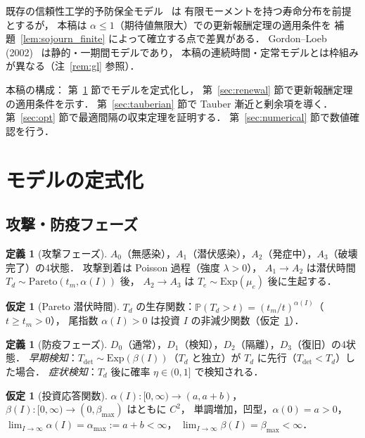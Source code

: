 \documentclass[12pt,a4paper]{article}
\theoremstyle{plain}
\theoremstyle{definition}
\newtheorem{definition}[theorem]{定義}
\newtheorem{assumption}[theorem]{仮定}
\theoremstyle{remark}
\newcommand{\Prob}{\mathbb{P}}
\newcommand{\Tdet}{T_{\mathrm{det}}}
\newcommand{\betaI}{\beta(I)}
\newcommand{\alphI}{\alpha(I)}
\begin{document}
既存の信頼性工学的予防保全モデル~\cite{barlow1965,nakagawa2005} は
有限モーメントを持つ寿命分布を前提とするが，
本稿は $\alpha\le1$（期待値無限大）での更新報酬定理の適用条件を
補題~\ref{lem:sojourn_finite} によって確立する点で差異がある．
Gordon--Loeb (2002)~\cite{gordon2002} は静的・一期間モデルであり，
本稿の連続時間・定常モデルとは枠組みが異なる（注~\ref{rem:gl} 参照）．

本稿の構成：
第~\ref{sec:model} 節でモデルを定式化し，
第~\ref{sec:renewal} 節で更新報酬定理の適用条件を示す．
第~\ref{sec:tauberian} 節で Tauber 漸近と剰余項を導く．
第~\ref{sec:opt} 節で最適間隔の収束定理を証明する．
第~\ref{sec:numerical} 節で数値確認を行う．

\section{モデルの定式化}
\label{sec:model}

\subsection{攻撃・防疫フェーズ}

\begin{definition}[攻撃フェーズ]\label{def:attack}
$A_0$（無感染），$A_1$（潜伏感染），$A_2$（発症中），$A_3$（破壊完了）の4状態．
攻撃到着は Poisson 過程（強度 $\lambda>0$），
$A_1\to A_2$ は潜伏時間 $T_d\sim\mathrm{Pareto}(t_m,\alphI)$ 後，
$A_2\to A_3$ は $T_e\sim\mathrm{Exp}(\mu_e)$ 後に生起する．
\end{definition}

\begin{assumption}[Pareto 潜伏時間]\label{ass:pareto}
$T_d$ の生存関数：$\Prob(T_d>t)=(t_m/t)^{\alphI}$（$t\ge t_m>0$），
尾指数 $\alphI>0$ は投資 $I$ の非減少関数（仮定~\ref{ass:alpha}）．
\end{assumption}

\begin{definition}[防疫フェーズ]\label{def:defense}
$D_0$（通常），$D_1$（検知），$D_2$（隔離），$D_3$（復旧）の4状態．
\emph{早期検知}：$\Tdet\sim\mathrm{Exp}(\betaI)$（$T_d$ と独立）が $T_d$ に先行（$\Tdet<T_d$）した場合．
\emph{症状検知}：$T_d$ 後に確率 $\eta\in(0,1]$ で検知される．
\end{definition}

\begin{assumption}[投資応答関数]\label{ass:alpha}
$\alphI:[0,\infty)\to(a,a+b)$，$\betaI:[0,\infty)\to(0,\beta_{\max})$ はともに $C^2$，
単調増加，凹型，$\alpha(0)=a>0$，$\lim_{I\to\infty}\alphI=\alpha_{\max}:=a+b<\infty$，
$\lim_{I\to\infty}\betaI=\beta_{\max}<\infty$．
\end{assumption}
\end{document}
